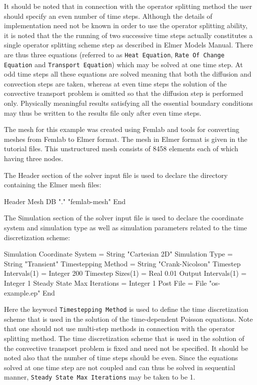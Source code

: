 It should be noted that in connection with the operator splitting method
the user should specify an even number of time steps.
Although the details of implementation need not be known in order to use
the operator splitting ability, it is noted that the the running of two 
successive time steps actually constitutes a single operator splitting scheme
step as described in Elmer Models Manual. 
There are thus three equations (referred to as {\tt Heat Equation},
{\tt Rate Of Change Equation} and {\tt Transport Equation}) which may be 
solved at one time step. 
At odd time steps all these equations are solved meaning that
both the diffusion and convection steps are taken, whereas at even time
steps the solution of the convective transport problem is omitted so that
the diffusion step is performed only. Physically meaningful results
satisfying all the essential boundary conditions may thus be written to
the results file only after even time steps.
 
The mesh for this example was created using Femlab and tools for 
converting meshes from Femlab to Elmer format. The mesh in Elmer format is 
given in the tutorial files. This unstructured mesh
consists of 8458 elements each of which having three nodes.    

The Header section of the solver input file is used to declare the directory
containing the Elmer mesh files:

\ttbegin
Header
  Mesh DB "." "femlab-mesh"
End
\ttend

The Simulation section of the solver input file is used to declare the 
coordinate system and simulation type as well as simulation parameters 
related to the time discretization scheme: 

\ttbegin
Simulation
  Coordinate System = String "Cartesian 2D"
  Simulation Type = String "Transient"
  Timestepping Method = String "Crank-Nicolson"
  Timestep Intervals(1) = Integer 200
  Timestep Sizes(1) = Real 0.01
  Output Intervals(1) = Integer 1
  Steady State Max Iterations = Integer 1
  Post File = File "os-example.ep"
End
\ttend

Here the keyword {\tt Timestepping Method} is used to 
define the time discretization scheme that is used in the solution of the 
time-dependent Poisson equations. Note that one should not use 
multi-step methods in connection with the operator splitting method. 
The time discretization scheme that is used
in the solution of the convective transport problem is fixed and need not
be specified. It should be noted also that
the number of time steps should be even. Since the equations
solved at one time step are not coupled and can thus be solved in sequential 
manner, {\tt Steady State Max Iterations} may be taken to be 1.     

